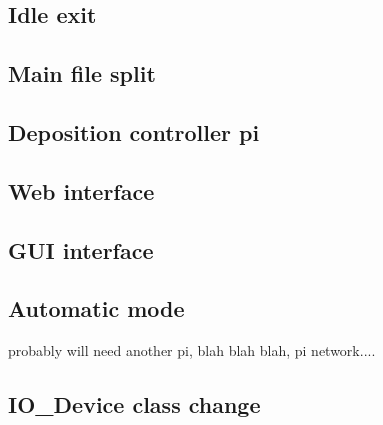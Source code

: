 \documentclass{article}
\begin{document}
\subsection{Idle exit}
\label{section:idleE}

\subsection{Main file split}
\label{section:mainsplit}

\subsection{Deposition controller pi}

\subsection{Web interface}

\subsection{GUI interface}

\subsection{Automatic mode}
\label{section:auto}
probably will need another pi, blah blah blah, pi network....

\subsection{IO\_Device class change}
\label{section:IOclassedit}
\end{document}
